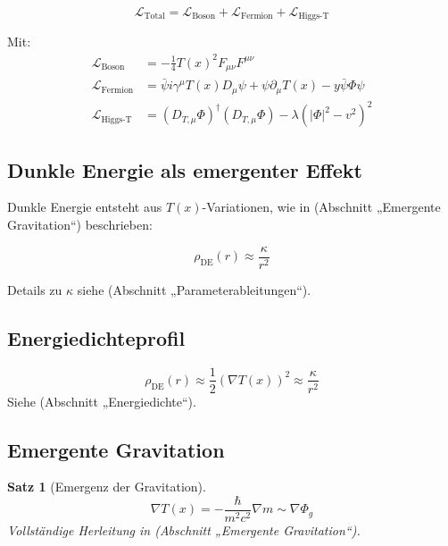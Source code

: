 \documentclass[a4paper,12pt]{article}
\newtheorem{theorem}{Satz}[section]
\theoremstyle{definition}
\theoremstyle{remark}
\newcommand{\Tfield}{T(x)} %
\newcommand{\DcovT}[1]{\Tfield D_\mu #1 + #1 \partial_\mu \Tfield}
\begin{document}
	\begin{equation}
		\mathcal{L}_{\text{Total}} = \mathcal{L}_{\text{Boson}} + \mathcal{L}_{\text{Fermion}} + \mathcal{L}_{\text{Higgs-T}}
	\end{equation}
	
	Mit:
	\begin{align}
		\mathcal{L}_{\text{Boson}} &= -\frac{1}{4} \Tfield^2 F_{\mu\nu} F^{\mu\nu} \\
		\mathcal{L}_{\text{Fermion}} &= \bar{\psi} i \gamma^\mu \DcovT{\psi} - y \bar{\psi} \Phi \psi \\
		\mathcal{L}_{\text{Higgs-T}} &= (D_{T,\mu} \Phi)^\dagger (D_{T,\mu} \Phi) - \lambda (|\Phi|^2 - v^2)^2
	\end{align}
	
	\subsection{Dunkle Energie als emergenter Effekt}
	
	Dunkle Energie entsteht aus \(\Tfield\)-Variationen, wie in \cite{pascher_galaxies_2025} (Abschnitt „Emergente Gravitation“) beschrieben:
	
	\begin{equation}
		\rho_{\text{DE}}(r) \approx \frac{\kappa}{r^2}
	\end{equation}
	
	Details zu \(\kappa\) siehe \cite{pascher_params_2025} (Abschnitt „Parameterableitungen“).
	
	\subsection{Energiedichteprofil}
	
	\begin{equation}
		\rho_{\text{DE}}(r) \approx \frac{1}{2} (\nabla \Tfield)^2 \approx \frac{\kappa}{r^2}
	\end{equation}
	Siehe \cite{pascher_galaxies_2025} (Abschnitt „Energiedichte“).
	
	\subsection{Emergente Gravitation}
	
\begin{theorem}[Emergenz der Gravitation]
	\begin{equation}
		\nabla \Tfield = -\frac{\hbar}{m^2 c^2} \nabla m \sim \nabla \Phi_g
	\end{equation}
	Vollständige Herleitung in \cite{pascher_galaxies_2025} (Abschnitt „Emergente Gravitation“).
\end{theorem}
\end{document}
